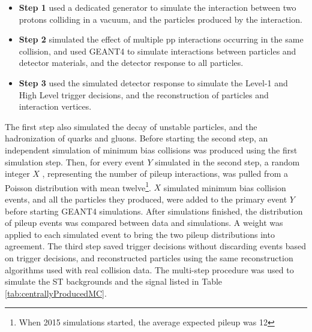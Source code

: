 \begin{itemize}
	\item \textbf{Step 1} used a dedicated \MC generator to simulate the interaction between two protons 
		colliding in a vacuum, and the particles produced by the interaction.
	\item \textbf{Step 2} simulated the effect of multiple pp interactions occurring in the same collision, 
		and used GEANT4 \cite{geant4} to simulate interactions between particles and detector materials, 
		and the detector response to all particles.
	\item \textbf{Step 3} used the simulated detector response to simulate the Level-1 and High Level 
		trigger decisions, and the reconstruction of particles and interaction vertices.
\end{itemize}

The first step also simulated the decay of unstable particles, and the hadronization of quarks and gluons.  
Before starting the second step, an independent \MC simulation of minimum bias collisions was produced 
using the first simulation step.  Then, for every event $Y$ simulated in the second step, a random integer $X$ 
, representing the number of pileup interactions, was pulled from a Poisson distribution with mean twelve\footnote{When 2015 \MC simulations started, the 
average expected pileup was 12}.  $X$ simulated minimum bias collision events, and all 
the particles they produced, were added to the primary event $Y$ before starting GEANT4 simulations.  After 
simulations finished, the distribution of pileup events was compared between data and simulations.  A weight 
was applied to each simulated event to bring the two pileup distributions into agreement.  The 
third step saved trigger decisions without discarding events based on trigger decisions, and reconstructed 
particles using the same reconstruction algorithms used with real collision data.  The multi-step procedure 
was used to simulate the ST backgrounds and the \WR signal listed in Table \ref{tab:centrallyProducedMC}.

